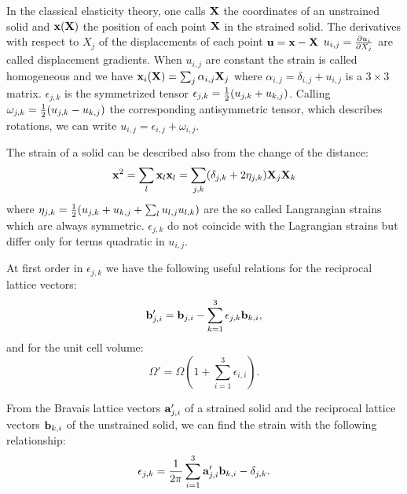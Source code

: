 \documentclass[12pt,a4paper,twoside]{report}
\begin{document}
In the classical elasticity theory, one
calls ${\bf X}$ the coordinates of an unstrained solid and
${\bf x}({\bf X})$ the position of each point ${\bf X}$ in
the strained solid. The derivatives with respect to $X_j$ of the
displacements of each point ${\bf u}= {\bf x} -{\bf X}$ 
$u_{i,j}= {\partial u_i \over \partial X_j}$ are called
displacement gradients. When $u_{i,j}$ are constant the strain
is called homogeneous and we have ${\bf x}_i({\bf X}) = 
\sum_j\alpha_{i,j} {\bf X}_j$ where 
$\alpha_{i,j}=\delta_{i,j}+u_{i,j}$ is a $3\times 3$ matrix. 
$\epsilon_{j,k}$
is the symmetrized tensor $\epsilon_{j,k}={1\over 2} ( u_{j,k} +
u_{k,j})$. Calling $\omega_{j,k}={1\over 2} ( u_{j,k} -
u_{k,j})$ the corresponding antisymmetric tensor, which describes
rotations, we can write $u_{i,j}=\epsilon_{i,j}+\omega_{i,j}$.

The strain of a solid can be described also from the change of the
distance:
\begin{equation}
{\bf x}^2=\sum_l {\bf x}_l {\bf x}_l = \sum_{j,k}(\delta_{j,k} +
2 \eta_{j,k}) {\bf X}_j {\bf X}_k 
\end{equation}
where $\eta_{j,k}={1\over 2} ( u_{j,k} + u_{k,j} + \sum_l u_{l,j}u_{l,k})$ 
are the so called Langrangian strains which are always symmetric.
$\epsilon_{j,k}$ do not coincide with the Lagrangian strains but
differ only for terms quadratic in $u_{i,j}$. 

At first order in $\epsilon_{j,k}$ we have
the following useful relations for the reciprocal lattice vectors:
\begin{equation}
{\bf b}'_{j,i} = {\bf b}_{j,i} -  \sum_{k=1}^3 \epsilon_{j,k} {\bf b}_{k,i},
\end{equation}
and for the unit cell volume:
\begin{equation}
\Omega'=\Omega \left( 1+\sum_{i=1}^3 \epsilon_{i,i} \right).
\end{equation}

From the Bravais lattice vectors ${\bf a}'_{j,i}$ of a strained solid and 
the reciprocal lattice vectors ${\bf b}_{k,i}$ of the unstrained solid, 
we can find the strain with the following relationship:
\begin{equation}
\epsilon_{j,k} = {1\over 2 \pi} \sum_{i=1}^3 {\bf a}'_{j,i} {\bf b}_{k,i}
                - \delta_{j,k}.
\end{equation}
\end{document}
